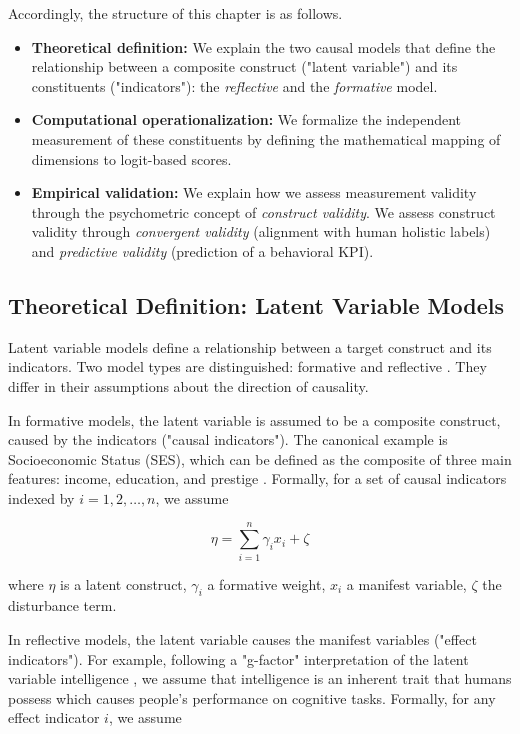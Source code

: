 Accordingly, the structure of this chapter is as follows. 

\begin{itemize}
    \item \textbf{Theoretical definition:} We explain the two causal models that define the relationship between a composite construct ("latent variable") and its constituents ("indicators"): the \emph{reflective} and the \emph{formative} model. 
    \item \textbf{Computational operationalization:} We formalize the independent measurement of these constituents by defining the mathematical mapping of dimensions to logit-based scores. 
    \item \textbf{Empirical validation:} We explain how we assess measurement validity through the psychometric concept of \textit{construct validity}. We assess construct validity through \textit{convergent validity} (alignment with human holistic labels) and \textit{predictive validity} (prediction of a behavioral KPI). 
\end{itemize}



\subsection{Theoretical Definition: Latent Variable Models}\label{sec:theoretical_definition}

Latent variable models define a relationship between a target construct and its indicators. Two model types are distinguished: formative and reflective \citep{bollen1991conventional}. They differ in their assumptions about the direction of causality. 

In formative models, the latent variable is assumed to be a composite construct, caused by the indicators ("causal indicators"). The canonical example is Socioeconomic Status (SES), which can be defined as the composite of three main features: income, education, and prestige \citep{mcquitty2013structural}. Formally, for a set of causal indicators indexed by $i = 1,2, \dots ,n$, we assume

\begin{equation}\label{eq:formative_model}
    \eta = \sum_{i=1}^{n} \gamma_i x_i + \zeta
\end{equation}

where $\eta$ is a latent construct, $\gamma_i$ a formative weight, $x_i$ a manifest variable, $\zeta$ the disturbance term. 

In reflective models, the latent variable causes the manifest variables ("effect indicators"). For example, following a "g-factor" interpretation of the latent variable intelligence \citep{spearman1961general}, we assume that intelligence is an inherent trait that humans possess which causes people's performance on cognitive tasks. Formally, for any effect indicator $i$, we assume

